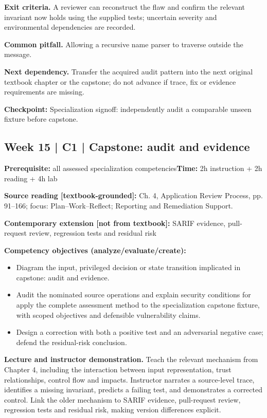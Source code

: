 \documentclass[10pt,letterpaper]{article}
\begin{document}
\textbf{Exit criteria.} A reviewer can reconstruct the flaw and confirm the relevant invariant now holds using the supplied tests; uncertain severity and environmental dependencies are recorded.

\textbf{Common pitfall.} Allowing a recursive name parser to traverse outside the message.

\textbf{Next dependency.} Transfer the acquired audit pattern into the next original textbook chapter or the capstone; do not advance if trace, fix or evidence requirements are missing.

\begin{historynote}\textbf{Checkpoint:} Specialization signoff: independently audit a comparable unseen fixture before capstone.\end{historynote}
\subsection{Week 15 | C1 | Capstone: audit and evidence}
\textbf{Prerequisite:} all assessed specialization competencies\hfill\textbf{Time:} 2h instruction + 2h reading + 4h lab

\textbf{Source reading [textbook-grounded]:} Ch. 4, Application Review Process, pp. 91--166; focus: Plan--Work--Reflect; Reporting and Remediation Support.

\textbf{Contemporary extension [not from textbook]:} SARIF evidence, pull-request review, regression tests and residual risk

\textbf{Competency objectives (analyze/evaluate/create):}
\begin{itemize}[leftmargin=*,itemsep=2pt]
\item Diagram the input, privileged decision or state transition implicated in capstone: audit and evidence.
\item Audit the nominated source operations and explain security conditions for apply the complete assessment method to the specialization capstone fixture, with scoped objectives and defensible vulnerability claims.
\item Design a correction with both a positive test and an adversarial negative case; defend the residual-risk conclusion.
\end{itemize}
\textbf{Lecture and instructor demonstration.} Teach the relevant mechanism from Chapter 4, including the interaction between input representation, trust relationships, control flow and impacts. Instructor narrates a source-level trace, identifies a missing invariant, predicts a failing test, and demonstrates a corrected control. Link the older mechanism to SARIF evidence, pull-request review, regression tests and residual risk, making version differences explicit.
\end{document}
